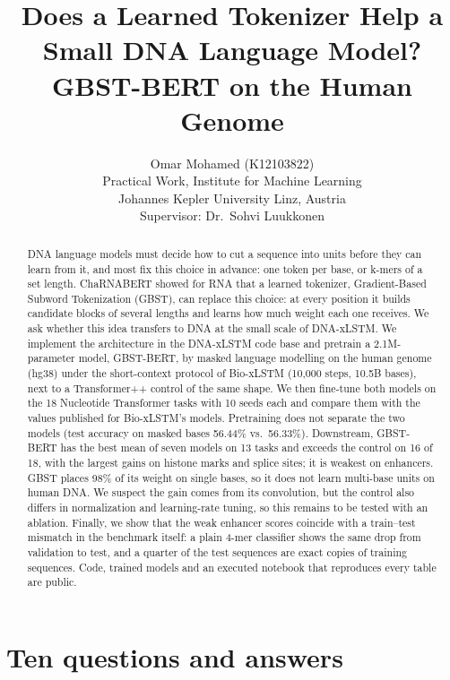 \documentclass{article}
\title{Does a Learned Tokenizer Help a Small DNA Language Model?\\ GBST-BERT on the Human Genome}
\author{
  Omar Mohamed (K12103822)\\
  Practical Work, Institute for Machine Learning\\
  Johannes Kepler University Linz, Austria\\
  Supervisor: Dr.\ Sohvi Luukkonen
}
\begin{document}
\maketitle

\begin{abstract}
DNA language models must decide how to cut a sequence into units before they can learn from it, and
most fix this choice in advance: one token per base, or k-mers of a set length. ChaRNABERT showed
for RNA that a learned tokenizer, Gradient-Based Subword Tokenization (GBST), can replace this choice:
at every position it builds candidate blocks of several lengths and learns how much weight each one
receives. We ask whether this idea transfers to DNA at the small scale of DNA-xLSTM. We implement
the architecture in the DNA-xLSTM code base and pretrain a 2.1M-parameter model, GBST-BERT, by
masked language modelling on the human genome (hg38) under the short-context protocol of Bio-xLSTM
(10,000 steps, 10.5B bases), next to a Transformer++ control of the same shape. We then fine-tune
both models on the 18 Nucleotide Transformer tasks with 10 seeds each and compare them with the
values published for Bio-xLSTM's models. Pretraining does not separate the two models (test
accuracy on masked bases 56.44\% vs.\ 56.33\%). Downstream, GBST-BERT has the best mean of seven
models on 13 tasks and exceeds the control on 16 of 18, with the largest gains on histone marks and
splice sites; it is weakest on enhancers. GBST places 98\% of its weight on single bases, so it
does not learn multi-base units on human DNA. We suspect the gain comes from its convolution, but
the control also differs in normalization and learning-rate tuning, so this remains to be tested
with an ablation. Finally, we show that the weak enhancer scores coincide with a train--test
mismatch in the benchmark itself: a plain 4-mer classifier shows the same drop from validation to
test, and a quarter of the test sequences are exact copies of training sequences. Code, trained
models and an executed notebook that reproduces every table are public.
\end{abstract}

\section*{Ten questions and answers}
\end{document}
